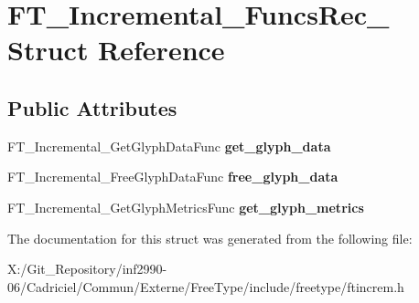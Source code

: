 \hypertarget{struct_f_t___incremental___funcs_rec__}{\section{F\-T\-\_\-\-Incremental\-\_\-\-Funcs\-Rec\-\_\- Struct Reference}
\label{struct_f_t___incremental___funcs_rec__}
}
\subsection*{Public Attributes}
\begin{DoxyCompactItemize}
\item 
\hypertarget{struct_f_t___incremental___funcs_rec___ac276b7ff9624b8d8bf144ab8d00538b4}{F\-T\-\_\-\-Incremental\-\_\-\-Get\-Glyph\-Data\-Func {\bfseries get\-\_\-glyph\-\_\-data}}\label{struct_f_t___incremental___funcs_rec___ac276b7ff9624b8d8bf144ab8d00538b4}

\item 
\hypertarget{struct_f_t___incremental___funcs_rec___a9201afcfda8c15be839aee04306dff0a}{F\-T\-\_\-\-Incremental\-\_\-\-Free\-Glyph\-Data\-Func {\bfseries free\-\_\-glyph\-\_\-data}}\label{struct_f_t___incremental___funcs_rec___a9201afcfda8c15be839aee04306dff0a}

\item 
\hypertarget{struct_f_t___incremental___funcs_rec___ac7d95e85357ab9d1893660b0628c1908}{F\-T\-\_\-\-Incremental\-\_\-\-Get\-Glyph\-Metrics\-Func {\bfseries get\-\_\-glyph\-\_\-metrics}}\label{struct_f_t___incremental___funcs_rec___ac7d95e85357ab9d1893660b0628c1908}

\end{DoxyCompactItemize}


The documentation for this struct was generated from the following file\-:\begin{DoxyCompactItemize}
\item 
X\-:/\-Git\-\_\-\-Repository/inf2990-\/06/\-Cadriciel/\-Commun/\-Externe/\-Free\-Type/include/freetype/ftincrem.\-h\end{DoxyCompactItemize}
